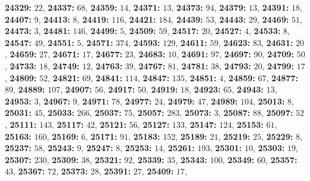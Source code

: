 \textsf{\bfseries 24329:} $22$, \textsf{\bfseries 24337:} $68$, \textsf{\bfseries 24359:} $14$, \textsf{\bfseries 24371:} $13$, \textsf{\bfseries 24373:} $94$, \textsf{\bfseries 24379:} $13$, \textsf{\bfseries 24391:} $18$, \textsf{\bfseries 24407:} $9$, \textsf{\bfseries 24413:} $8$, \textsf{\bfseries 24419:} $116$, \textsf{\bfseries 24421:} $184$, \textsf{\bfseries 24439:} $53$, \textsf{\bfseries 24443:} $29$, \textsf{\bfseries 24469:} $51$, \textsf{\bfseries 24473:} $3$, \textsf{\bfseries 24481:} $146$, \textsf{\bfseries 24499:} $5$, \textsf{\bfseries 24509:} $59$, \textsf{\bfseries 24517:} $20$, \textsf{\bfseries 24527:} $4$, \textsf{\bfseries 24533:} $8$, \textsf{\bfseries 24547:} $49$, \textsf{\bfseries 24551:} $5$, \textsf{\bfseries 24571:} $374$, \textsf{\bfseries 24593:} $129$, \textsf{\bfseries 24611:} $59$, \textsf{\bfseries 24623:} $83$, \textsf{\bfseries 24631:} $20$, \textsf{\bfseries 24659:} $27$, \textsf{\bfseries 24671:} $17$, \textsf{\bfseries 24677:} $23$, \textsf{\bfseries 24683:} $10$, \textsf{\bfseries 24691:} $97$, \textsf{\bfseries 24697:} $90$, \textsf{\bfseries 24709:} $50$, \textsf{\bfseries 24733:} $18$, \textsf{\bfseries 24749:} $12$, \textsf{\bfseries 24763:} $39$, \textsf{\bfseries 24767:} $81$, \textsf{\bfseries 24781:} $38$, \textsf{\bfseries 24793:} $20$, \textsf{\bfseries 24799:} $17$, \textsf{\bfseries 24809:} $52$, \textsf{\bfseries 24821:} $69$, \textsf{\bfseries 24841:} $114$, \textsf{\bfseries 24847:} $135$, \textsf{\bfseries 24851:} $4$, \textsf{\bfseries 24859:} $67$, \textsf{\bfseries 24877:} $89$, \textsf{\bfseries 24889:} $107$, \textsf{\bfseries 24907:} $56$, \textsf{\bfseries 24917:} $50$, \textsf{\bfseries 24919:} $18$, \textsf{\bfseries 24923:} $65$, \textsf{\bfseries 24943:} $13$, \textsf{\bfseries 24953:} $3$, \textsf{\bfseries 24967:} $9$, \textsf{\bfseries 24971:} $78$, \textsf{\bfseries 24977:} $24$, \textsf{\bfseries 24979:} $47$, \textsf{\bfseries 24989:} $104$, \textsf{\bfseries 25013:} $8$, \textsf{\bfseries 25031:} $45$, \textsf{\bfseries 25033:} $266$, \textsf{\bfseries 25037:} $75$, \textsf{\bfseries 25057:} $283$, \textsf{\bfseries 25073:} $3$, \textsf{\bfseries 25087:} $88$, \textsf{\bfseries 25097:} $52$, \textsf{\bfseries 25111:} $143$, \textsf{\bfseries 25117:} $42$, \textsf{\bfseries 25121:} $56$, \textsf{\bfseries 25127:} $133$, \textsf{\bfseries 25147:} $124$, \textsf{\bfseries 25153:} $61$, \textsf{\bfseries 25163:} $160$, \textsf{\bfseries 25169:} $6$, \textsf{\bfseries 25171:} $91$, \textsf{\bfseries 25183:} $152$, \textsf{\bfseries 25189:} $21$, \textsf{\bfseries 25219:} $25$, \textsf{\bfseries 25229:} $8$, \textsf{\bfseries 25237:} $58$, \textsf{\bfseries 25243:} $9$, \textsf{\bfseries 25247:} $8$, \textsf{\bfseries 25253:} $14$, \textsf{\bfseries 25261:} $193$, \textsf{\bfseries 25301:} $10$, \textsf{\bfseries 25303:} $19$, \textsf{\bfseries 25307:} $230$, \textsf{\bfseries 25309:} $38$, \textsf{\bfseries 25321:} $92$, \textsf{\bfseries 25339:} $35$, \textsf{\bfseries 25343:} $100$, \textsf{\bfseries 25349:} $60$, \textsf{\bfseries 25357:} $43$, \textsf{\bfseries 25367:} $72$, \textsf{\bfseries 25373:} $28$, \textsf{\bfseries 25391:} $27$, \textsf{\bfseries 25409:} $17$, 
